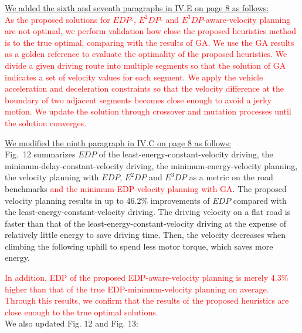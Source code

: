 \documentclass[onecolumn]{IEEEconf}
\begin{document}
\begin{description}
\uline{We added the sixth and seventh paragraphs in IV.E on page 8 as follows:}\\
\textcolor{red}{As the proposed solutions for  $EDP$-, $E^2DP$- and $E^3DP$-aware-velocity planning are not optimal, we perform  validation how close the proposed heuristics method is to the true optimal, comparing with the results of GA. We use the GA results as a golden reference to evaluate the optimality of the proposed heuristics.
We divide a given driving route into multiple segments so that the solution of GA indicates a set of velocity values for each segment. %
We apply the vehicle acceleration and deceleration constraints so that the velocity difference at the boundary of two adjacent segments becomes close enough to avoid a jerky motion. We update the solution through crossover and mutation processes until the solution converges.} 


\uline{We modified the ninth paragraph in IV.C on page 8 as follows:}\\
Fig.~12 summarizes $EDP$ of the least-energy-constant-velocity driving, the minimum-delay-constant-velocity driving, the minimum-energy-velocity planning, the velocity planning with $EDP$, $E^2DP$ and $E^3DP$ as a metric on the road benchmarks \textcolor{red}{and the minimum-EDP-velocity planning with GA}. The proposed velocity planning results in up to 46.2\% improvements of $EDP$ compared with the least-energy-constant-velocity driving. 
The driving velocity on a flat road is faster than that of the least-energy-constant-velocity driving at the expense of relatively little energy to save driving time. Then, the velocity decreases when climbing the following uphill to spend less motor torque, which saves more energy.

\textcolor{red}{In addition, EDP of the proposed EDP-aware-velocity planning is merely 4.3\% higher than that of the true EDP-minimum-velocity planning on average. Through this results, we confirm that the results of the proposed heuristics are close enough to the true optimal solutions.}\\

We also updated Fig. 12 and Fig. 13:


\end{description}
\end{document}

